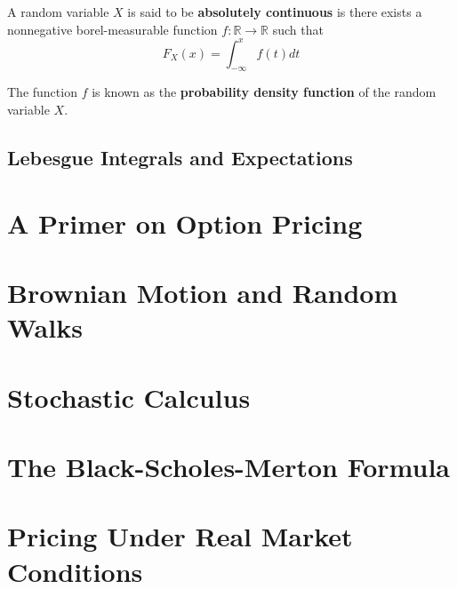 \documentclass[11pt]{report}
\begin{document}
\begin{definition}
	A random variable $X$ is said to be \textbf{absolutely continuous} is there exists a nonnegative borel-measurable function $f: \mathbb{R}\rightarrow\mathbb{R}$ such that 
	\begin{equation}
		F_X(x) = \int_{-\infty}^{x} f(t) dt
	\end{equation}
\end{definition}

The function $f$ is known as the \textbf{probability density function} of the random variable $X$.

\section{Lebesgue Integrals and Expectations}



\chapter{A Primer on Option Pricing}
\chapter{Brownian Motion and Random Walks}

\chapter{Stochastic Calculus}
\chapter{The Black-Scholes-Merton Formula}
\chapter{Pricing Under Real Market Conditions}
\newpage
\nocite{*}

\end{document}

